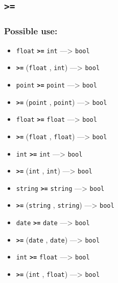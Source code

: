 \documentclass[]{book}
\providecommand{\tightlist}{%
  \setlength{\itemsep}{0pt}\setlength{\parskip}{0pt}}
\theoremstyle{definition}
\theoremstyle{definition}
\theoremstyle{definition}
\theoremstyle{remark}
\begin{document}
\subsection{\texorpdfstring{\texttt{\textgreater{}=}}{\textgreater{}=}}\label{section-18}

\subsubsection{Possible use:}\label{possible-use-15}

\begin{itemize}
\tightlist
\item
  \texttt{float} \textbf{\texttt{\textgreater{}=}} \texttt{int}
  ---\textgreater{} \texttt{bool}
\item
  \textbf{\texttt{\textgreater{}=}} (\texttt{float} , \texttt{int})
  ---\textgreater{} \texttt{bool}
\item
  \texttt{point} \textbf{\texttt{\textgreater{}=}} \texttt{point}
  ---\textgreater{} \texttt{bool}
\item
  \textbf{\texttt{\textgreater{}=}} (\texttt{point} , \texttt{point})
  ---\textgreater{} \texttt{bool}
\item
  \texttt{float} \textbf{\texttt{\textgreater{}=}} \texttt{float}
  ---\textgreater{} \texttt{bool}
\item
  \textbf{\texttt{\textgreater{}=}} (\texttt{float} , \texttt{float})
  ---\textgreater{} \texttt{bool}
\item
  \texttt{int} \textbf{\texttt{\textgreater{}=}} \texttt{int}
  ---\textgreater{} \texttt{bool}
\item
  \textbf{\texttt{\textgreater{}=}} (\texttt{int} , \texttt{int})
  ---\textgreater{} \texttt{bool}
\item
  \texttt{string} \textbf{\texttt{\textgreater{}=}} \texttt{string}
  ---\textgreater{} \texttt{bool}
\item
  \textbf{\texttt{\textgreater{}=}} (\texttt{string} , \texttt{string})
  ---\textgreater{} \texttt{bool}
\item
  \texttt{date} \textbf{\texttt{\textgreater{}=}} \texttt{date}
  ---\textgreater{} \texttt{bool}
\item
  \textbf{\texttt{\textgreater{}=}} (\texttt{date} , \texttt{date})
  ---\textgreater{} \texttt{bool}
\item
  \texttt{int} \textbf{\texttt{\textgreater{}=}} \texttt{float}
  ---\textgreater{} \texttt{bool}
\item
  \textbf{\texttt{\textgreater{}=}} (\texttt{int} , \texttt{float})
  ---\textgreater{} \texttt{bool}
\end{itemize}
\end{document}
